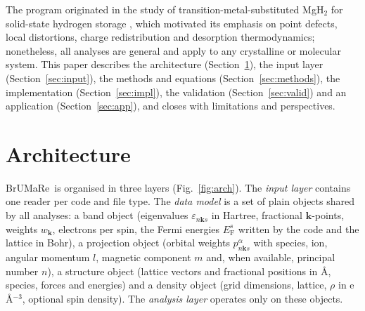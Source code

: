 \documentclass[11pt,a4paper]{article}
\newcommand{\eF}{E_\mathrm{F}}
\newcommand{\BMR}{\textsf{BrUMa\textcolor[HTML]{B26B00}{Re}}}
\begin{document}
The program originated in the study of transition-metal-substituted MgH$_2$ for solid-state hydrogen storage \cite{sakintuna2007,macedo2025tcc}, which motivated its emphasis on point defects, local distortions, charge redistribution and desorption thermodynamics; nonetheless, all analyses are general and apply to any crystalline or molecular system. This paper describes the architecture (Section~\ref{sec:arch}), the input layer (Section~\ref{sec:input}), the methods and equations (Section~\ref{sec:methods}), the implementation (Section~\ref{sec:impl}), the validation (Section~\ref{sec:valid}) and an application (Section~\ref{sec:app}), and closes with limitations and perspectives.

\section{Architecture}\label{sec:arch}
\BMR\ is organised in three layers (Fig.~\ref{fig:arch}). The \emph{input layer} contains one reader per code and file type. The \emph{data model} is a set of plain objects shared by all analyses: a band object (eigenvalues $\varepsilon_{n\bm{k} s}$ in Hartree, fractional $\bm{k}$-points, weights $w_{\bm{k}}$, electrons per spin, the Fermi energies $\eF^{s}$ written by the code and the lattice in Bohr), a projection object (orbital weights $p^{\alpha}_{n\bm{k} s}$ with species, ion, angular momentum $l$, magnetic component $m$ and, when available, principal number $n$), a structure object (lattice vectors and fractional positions in \AA, species, forces and energies) and a density object (grid dimensions, lattice, $\rho$ in e\,\AA$^{-3}$, optional spin density). The \emph{analysis layer} operates only on these objects.
\end{document}
